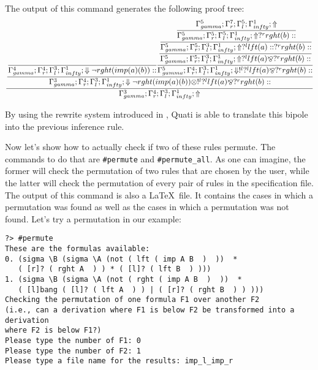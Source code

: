 \documentclass{llncs}
\begin{document}
The output of this command generates the following proof tree:
%
{\scriptsize\[\cfrac{\cfrac{\cfrac{}
{\Gamma_{ gamma}^{4} ; \Gamma_{r}^{4} ; \Gamma_{l}^{3} ; \Gamma_{ infty}^{1} ;  \Downarrow \neg rght (imp (a) (b) )  :: }\cfrac{\cfrac{\cfrac{\cfrac{\Gamma_{ gamma}^{5} ; \Gamma_{r}^{7} ; \Gamma_{l}^{5} ; \Gamma_{ infty}^{1} ;  \Uparrow }
{\Gamma_{ gamma}^{5} ; \Gamma_{r}^{5} ; \Gamma_{l}^{5} ; \Gamma_{ infty}^{1} ;  \Uparrow  ?^{r} rght (b)  :: }}
{\Gamma_{ gamma}^{5} ; \Gamma_{r}^{5} ; \Gamma_{l}^{3} ; \Gamma_{ infty}^{1} ;  \Uparrow  ?^{l} lft (a)  ::  ?^{r} rght (b)  :: }}
{\Gamma_{ gamma}^{5} ; \Gamma_{r}^{5} ; \Gamma_{l}^{3} ; \Gamma_{ infty}^{1} ;  \Uparrow  ?^{l} lft (a)  \bindnasrepma  ?^{r} rght (b)  :: }}
{\Gamma_{ gamma}^{5} ; \Gamma_{r}^{4} ; \Gamma_{l}^{3} ; \Gamma_{ infty}^{1} ;  \Downarrow  !^{l}  ?^{l} lft (a)  \bindnasrepma  ?^{r} rght (b)  :: }}
{\Gamma_{ gamma}^{3} ; \Gamma_{r}^{4} ; \Gamma_{l}^{3} ; \Gamma_{ infty}^{1} ;  \Downarrow \neg rght (imp (a) (b) )  \otimes  !^{l}  ?^{l} lft (a)  \bindnasrepma  ?^{r} rght (b)  :: }}
{\Gamma_{ gamma}^{3} ; \Gamma_{r}^{4} ; \Gamma_{l}^{3} ; \Gamma_{ infty}^{1} ; \Uparrow }\]}

By using the rewrite system introduced in \cite{nigam13iclp}, Quati is able to
translate this bipole into the previous inference rule.

Now let's show how to actually check if two of these rules permute. The commands
to do that are \texttt{\#permute} and \texttt{\#permute\_all}. As one can
imagine, the former will check the permutation of two rules that are chosen by
the user, while the latter will check the permutation of every pair of rules in
the specification file. The output of this command is also a \LaTeX\ file. It
contains the cases in which a permutation was found as well as the cases in
which a permutation was not found. Let's try a permutation in our example:
\vspace{-1mm}

{\small
\begin{verbatim}
?> #permute
These are the formulas available: 
0. (sigma \B (sigma \A (not ( lft ( imp A B  )  ))  * 
   ( [r]? ( rght A  ) ) * ( [l]? ( lft B  ) )))
1. (sigma \B (sigma \A (not ( rght ( imp A B  )  ))  * 
   ( [l]bang ( [l]? ( lft A  ) ) | ( [r]? ( rght B  ) ) )))
Checking the permutation of one formula F1 over another F2 
(i.e., can a derivation where F1 is below F2 be transformed into a derivation 
where F2 is below F1?) 
Please type the number of F1: 0
Please type the number of F2: 1
Please type a file name for the results: imp_l_imp_r
\end{verbatim}
}
\end{document}
